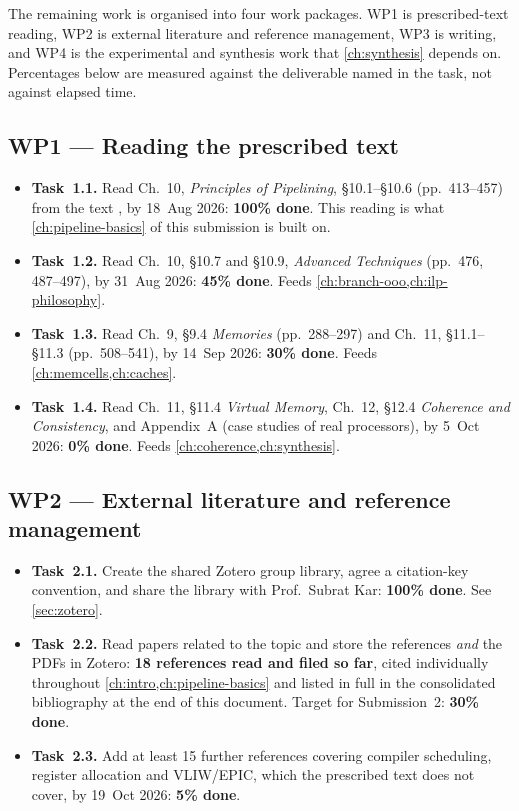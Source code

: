 \documentclass[12pt,a4paper]{report}
\begin{document}
The remaining work is organised into four work packages. WP1 is
prescribed-text reading, WP2 is external literature and reference
management, WP3 is writing, and WP4 is the experimental and synthesis
work that \cref{ch:synthesis} depends on. Percentages below are measured
against the deliverable named in the task, not against elapsed time.

\subsection*{WP1 --- Reading the prescribed text}
\begin{itemize}[leftmargin=*]
  \item \textbf{Task~1.1.} Read Ch.~10, \emph{Principles of Pipelining},
    \S10.1--\S10.6 (pp.~413--457) from the text \cite{sarangi}, by
    18~Aug 2026: \textbf{100\% done}. This reading is what
    \cref{ch:pipeline-basics} of this submission is built on.
  \item \textbf{Task~1.2.} Read Ch.~10, \S10.7 and \S10.9,
    \emph{Advanced Techniques} (pp.~476, 487--497), by 31~Aug 2026:
    \textbf{45\% done}. Feeds \cref{ch:branch-ooo,ch:ilp-philosophy}.
  \item \textbf{Task~1.3.} Read Ch.~9, \S9.4 \emph{Memories}
    (pp.~288--297) and Ch.~11, \S11.1--\S11.3 (pp.~508--541), by
    14~Sep 2026: \textbf{30\% done}. Feeds
    \cref{ch:memcells,ch:caches}.
  \item \textbf{Task~1.4.} Read Ch.~11, \S11.4 \emph{Virtual Memory},
    Ch.~12, \S12.4 \emph{Coherence and Consistency}, and Appendix~A
    (case studies of real processors), by 5~Oct 2026:
    \textbf{0\% done}. Feeds \cref{ch:coherence,ch:synthesis}.
\end{itemize}

\subsection*{WP2 --- External literature and reference management}
\begin{itemize}[leftmargin=*]
  \item \textbf{Task~2.1.} Create the shared Zotero group library, agree
    a citation-key convention, and share the library with
    Prof.\ Subrat Kar: \textbf{100\% done}. See \cref{sec:zotero}.
  \item \textbf{Task~2.2.} Read papers related to the topic and store
    the references \emph{and} the PDFs in Zotero:
    \textbf{18 references read and filed so far}, cited individually
    throughout \cref{ch:intro,ch:pipeline-basics} and listed in full in
    the consolidated bibliography at the end of this document. Target for
    Submission~2: \textbf{30\% done}.
  \item \textbf{Task~2.3.} Add at least 15 further references covering
    compiler scheduling, register allocation and VLIW/EPIC, which the
    prescribed text does not cover, by 19~Oct 2026:
    \textbf{5\% done}.
\end{itemize}
\end{document}
